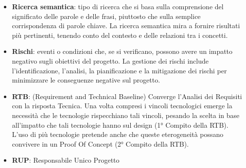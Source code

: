 \documentclass[a4paper,12pt]{article}
\begin{document}
\begin{itemize}
    \item \textbf{Ricerca semantica}: tipo di ricerca che si basa sulla comprensione del significato delle parole e delle frasi, piuttosto che sulla semplice corrispondenza di parole chiave. La ricerca semantica mira a fornire risultati più pertinenti, tenendo conto del contesto e delle relazioni tra i concetti.
    \item \textbf{Rischi}: eventi o condizioni che, se si verificano, possono avere un impatto negativo sugli obiettivi del progetto. La gestione dei rischi include l'identificazione, l'analisi, la pianificazione e la mitigazione dei rischi per minimizzare le conseguenze negative sul progetto.
    \item \textbf{RTB}: (Requirement and Technical Baseline) Converge l'Analisi dei Requisiti con la risposta Tecnica. Una volta compresi i vincoli tecnologici emerge la necessità che le tecnologie rispecchiano tali vincoli, pesando la scelta in base all'impatto che tali tecnologie hanno sul design (1° Compito della RTB). L'uso di più tecnologie pretende anche che queste eterogeneità possano convivere in un Proof Of Concept (2° Compito della RTB).
    \item \textbf{RUP}: Responsabile Unico Progetto
\end{itemize}
\end{document}
